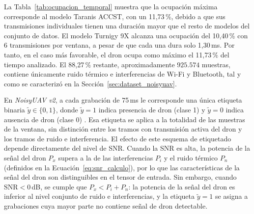 \begin{table}[htbp]
\centering
\small
\caption{Ciclo de trabajo empírico y ocupación temporal máxima por modelo en una ventana de observación de 75\,ms.}
\label{tab:ocupacion_temporal}
\end{table}

La Tabla~\ref{tab:ocupacion_temporal} muestra que la ocupación máxima corresponde al modelo Taranis ACCST, con un 11,73\,\%, debido a que sus transmisiones individuales tienen una duración mayor que el resto de modelos del conjunto de datos. El modelo Turnigy 9X alcanza una ocupación del 10,40\,\% con 6 transmisiones por ventana, a pesar de que cada una dura solo 1,30\,ms. Por tanto, en el caso más favorable, el dron ocupa como máximo el 11,73\,\% del tiempo analizado. El 88,27\,\% restante, aproximadamente $925.574$ muestras, contiene únicamente ruido térmico e interferencias de Wi-Fi y Bluetooth, tal y como se caracterizó en la Sección~\ref{sec:dataset_noisyuav}.

En \textit{NoisyUAV v2}, a cada grabación de 75\,ms le corresponde una única etiqueta binaria $\tilde{y} \in \{0,1\}$, donde $\tilde{y} = 1$ indica presencia de dron (clase 1) y $\tilde{y} = 0$ indica ausencia de dron (clase 0) \cite{gluge_robust_2024}. Esa etiqueta se aplica a la totalidad de las muestras de la ventana, sin distinción entre los tramos con transmisión activa del dron y los tramos de ruido e interferencia. El efecto de este esquema de etiquetado depende directamente del nivel de SNR. Cuando la SNR es alta, la potencia de la señal del dron $P_x$ supera a la de las interferencias $P_i$ y el ruido térmico $P_n$ (definidos en la Ecuación~\ref{eq:snr_calculo}), por lo que las características de la señal del dron son distinguibles en el tensor de entrada. Sin embargo, cuando $\text{SNR} < 0$\,dB, se cumple que $P_x < P_i + P_n$: la potencia de la señal del dron es inferior al nivel conjunto de ruido e interferencias, y la etiqueta $\tilde{y} = 1$ se asigna a grabaciones cuya mayor parte no contiene señal de dron detectable.

